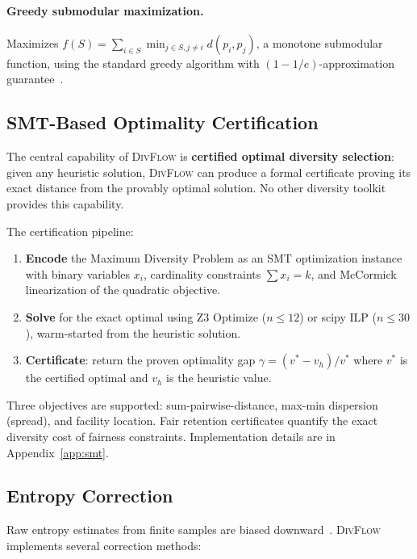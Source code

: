 \documentclass[11pt,a4paper]{article}
\newcommand{\divflow}{\textsc{DivFlow}}
\begin{document}
\paragraph{Greedy submodular maximization.}
Maximizes $f(S) = \sum_{i \in S} \min_{j \in S, j \neq i}
d(p_i, p_j)$, a monotone submodular function, using the
standard greedy algorithm with $(1 - 1/e)$-approximation
guarantee~\citep{nemhauser1978analysis}.

\subsection{SMT-Based Optimality Certification}\label{sec:smt}

The central capability of \divflow{} is \textbf{certified optimal
diversity selection}: given any heuristic solution, \divflow{}
can produce a formal certificate proving its exact distance
from the provably optimal solution.  No other diversity toolkit
provides this capability.

The certification pipeline:
\begin{enumerate}[leftmargin=2em,itemsep=2pt]
\item \textbf{Encode} the Maximum Diversity Problem as an
      SMT optimization instance with binary variables $x_i$,
      cardinality constraints $\sum x_i = k$, and McCormick
      linearization of the quadratic objective.
\item \textbf{Solve} for the exact optimal using Z3 Optimize
      ($n \leq 12$) or scipy ILP ($n \leq 30$), warm-started
      from the heuristic solution.
\item \textbf{Certificate}: return the proven optimality
      gap $\gamma = (v^* - v_h) / v^*$ where $v^*$ is the
      certified optimal and $v_h$ is the heuristic value.
\end{enumerate}

Three objectives are supported: sum-pairwise-distance,
max-min dispersion (spread), and facility location.
Fair retention certificates quantify the exact diversity
cost of fairness constraints.
Implementation details are in Appendix~\ref{app:smt}.

\subsection{Entropy Correction}\label{sec:correction}

Raw entropy estimates from finite samples are biased
downward~\citep{miller1955note}.  \divflow{} implements
several correction methods:
\end{document}
